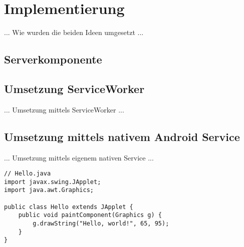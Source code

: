 \chapter{Implementierung}

... Wie wurden die beiden Ideen umgesetzt ...

\section{Serverkomponente}

\section{Umsetzung ServiceWorker}

... Umsetzung mittels ServiceWorker ...

\section{Umsetzung mittels nativem Android Service}

... Umsetzung mittels eigenem nativen Service ...

\begin{lstlisting}
// Hello.java
import javax.swing.JApplet;
import java.awt.Graphics;

public class Hello extends JApplet {
    public void paintComponent(Graphics g) {
        g.drawString("Hello, world!", 65, 95);
    }    
}
\end{lstlisting}
